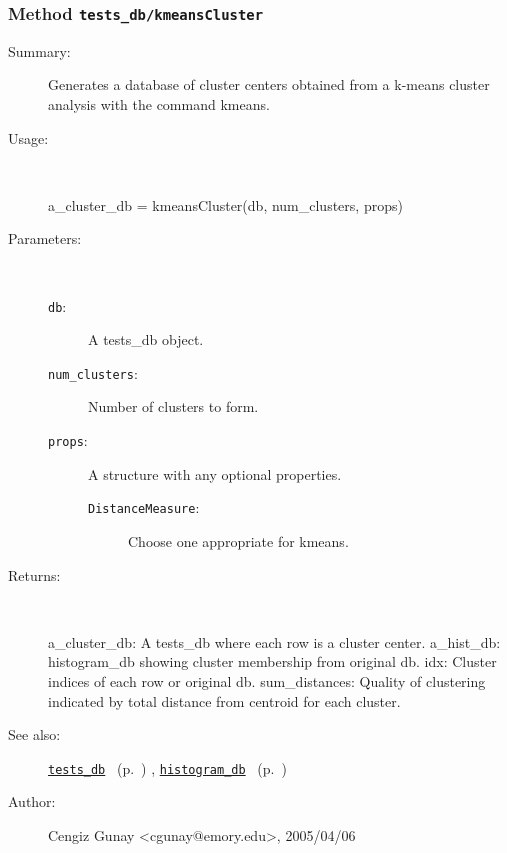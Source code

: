 \subsubsection[Method \texttt{kmeansCluster}]{Method \texttt{tests\_db/kmeansCluster}}%
%
\label{ref_tests_db__kmeansCluster}%
\hypertarget{ref_tests_db__kmeansCluster}{}%
\begin{description}
\item[Summary:]Generates a database of cluster centers obtained from a k-means cluster analysis with the command kmeans.
%
\item[Usage:]~%
\begin{lyxcode}%
a\_cluster\_db = kmeansCluster(db, num\_clusters, props)
%
\end{lyxcode}%
%
%
\item[Parameters:]~
\begin{description}%
\item[\texttt{db}:]
 A tests\_db object.
\item[\texttt{num\_clusters}:]
 Number of clusters to form.
\item[\texttt{props}:]
 A structure with any optional properties.
\begin{description}%
\item[\texttt{DistanceMeasure}:]
 Choose one appropriate for kmeans.
\end{description}%
\end{description}%
%
\item[Returns:
]~

	a\_cluster\_db: A tests\_db where each row is a cluster center.
	a\_hist\_db: histogram\_db showing cluster membership from original db.
	idx: Cluster indices of each row or original db.
	sum\_distances: Quality of clustering indicated by total distance from
			centroid for each cluster.
%
%
\item[See also:]%
\hyperlink{ref_tests_db}{\texttt{tests\_db}}%
\ (p.~\pageref{ref_tests_db})%
%
, \hyperlink{ref_histogram_db}{\texttt{histogram\_db}}%
\ (p.~\pageref{ref_histogram_db})%
%
%
\item[Author:]%
Cengiz Gunay <cgunay@emory.edu>, 2005/04/06
%
\end{description}
\methodline%
